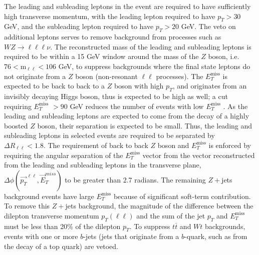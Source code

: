 \documentclass[12pt,a4paper,openright,twoside]{report}
\newcommand{\met}{$E_T^{\mathrm{miss}}$ }
\begin{document}
The leading and subleading leptons in the event are required to have sufficiently high transverse momentum, with the leading lepton required to have $p_T>30$ GeV, and the subleading lepton required to have $p_T>20$ GeV. The veto on additional leptons serves to remove background from processes such as $WZ\to \ell\ell\ell\nu$. The reconstructed mass of the leading and subleading leptons is required to be within a 15 GeV window around the mass of the $Z$ boson, i.e. $76<\mathrm{m_{\ell\ell}<106}$ GeV, to suppress backgrounds where the final state leptons do not originate from a $Z$ boson (non-resonant $\ell\ell$ processes). The \met is expected to be back to back to a $Z$ boson with high $p_T$, and originates from an invisibly decaying Higgs boson, thus is expected to be high as well; a cut requiring \met$>90$ GeV reduces the number of events with low \met. As the leading and subleading leptons are expected to come from the decay of a highly boosted $Z$ boson, their separation is expected to be small. Thus, the leading and subleading leptons in selected events are required to be separated by $\Delta R_{\ell\ell}<1.8$. The requirement of back to back $Z$ boson and \met is enforced by requiring the angular separation of the \met vector from the vector reconstructed from the leading and subleading leptons in the transverse plane, $\Delta\phi(\vec{p_T}^{\ell\ell},\vec{E}_T^{miss})$ to be greater than 2.7 radians. The remaining $Z+$jets background events have large \met because of significant soft-term contribution. To remove this $Z+$jets background, the magnitude of the difference between the dilepton transverse momentum $p_T(\ell\ell)$ and the sum of the jet $p_T$ and \met must be less than 20\% of the dilepton $p_T$. To suppress $t\bar{t}$ and $Wt$ backgrounds, events with one or more $b$-jets (jets that originate from a $b$-quark, such as from the decay of a top quark) are vetoed.
\end{document}
